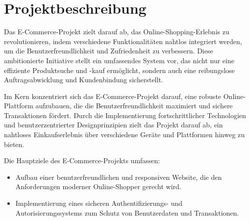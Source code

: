 	\tableofcontents
	\newpage
	\listoffigures
	\newpage
	
	\makeatletter
	\makeatother
	
	
	
	
	
	\chapter{Projektbeschreibung}
Das E-Commerce-Projekt zielt darauf ab, das Online-Shopping-Erlebnis zu revolutionieren, indem verschiedene Funktionalitäten nahtlos integriert werden, um die Benutzerfreundlichkeit und Zufriedenheit zu verbessern. Diese ambitionierte Initiative stellt ein umfassendes System vor, das nicht nur eine effiziente Produktsuche und -kauf ermöglicht, sondern auch eine reibungslose Auftragsabwicklung und Kundenbindung sicherstellt.

Im Kern konzentriert sich das E-Commerce-Projekt darauf, eine robuste Online-Plattform aufzubauen, die die Benutzerfreundlichkeit maximiert und sichere Transaktionen fördert. Durch die Implementierung fortschrittlicher Technologien und benutzerzentrierter Designprinzipien zielt das Projekt darauf ab, ein nahtloses Einkaufserlebnis über verschiedene Geräte und Plattformen hinweg zu bieten.

Die Hauptziele des E-Commerce-Projekts umfassen:
\begin{itemize}
	\item Aufbau einer benutzerfreundlichen und responsiven Website, die den Anforderungen moderner Online-Shopper gerecht wird.
	\item Implementierung eines sicheren Authentifizierungs- und Autorisierungssystems zum Schutz von Benutzerdaten und Transaktionen.
\end{itemize}

